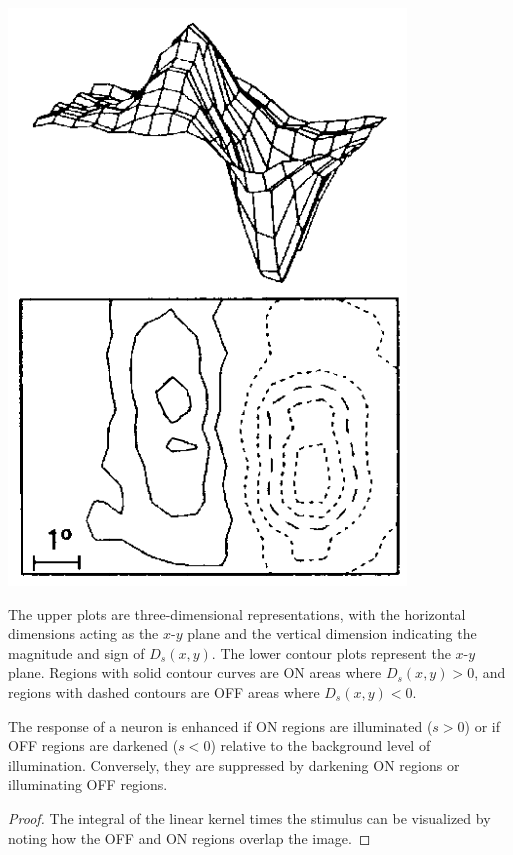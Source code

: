 \begin{exm}
\begin{center}
    \includegraphics[scale=0.25]{./png/spatialExm2}
  \end{center}
  The upper plots are three-dimensional representations, with the horizontal dimensions acting as the $x$-$y$ plane and the vertical dimension indicating the magnitude and sign of $D_s(x, y)$. The lower contour plots represent the $x$-$y$ plane. Regions with solid contour curves are ON areas where $D_s(x, y) > 0$, and regions with dashed contours are OFF areas where $D_s(x, y) < 0$.
\end{exm}

\begin{prop}
  \label{prop:OnOffEffect}
  The response of a neuron is enhanced if ON regions are illuminated ($s>0$) or if OFF regions are darkened ($s<0$) relative to the background level of illumination. Conversely, they are suppressed by darkening ON regions or illuminating OFF regions.
\end{prop}
\begin{proof}
  The integral of the linear kernel times the stimulus can be visualized by noting how the OFF and ON regions overlap the image.
\end{proof}

